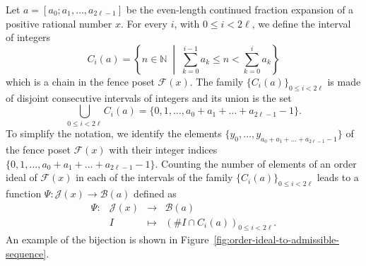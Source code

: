 \documentclass[a4paper,12pt]{amsart}
\newcommand{\N}{\mathbb{N}}
\newcommand{\xx}{{x}}
\newcommand{\Bcal}{{\mathcal{B}}}
\newcommand{\Fcal}{{\mathcal{F}}}
\newcommand{\Jcal}{{\mathcal{J}}}
\newcommand{\0}{\mathtt{0}}
\newcommand{\1}{\mathtt{1}}
\newcommand{\2}{\mathtt{2}}
\newcommand{\3}{\mathtt{3}}
\begin{document}
Let $a=[a_0;a_1,\dots,a_{2\ell-1}]$
be the even-length continued fraction expansion of a positive
rational number $x$.
For every $i$, with $0\leq i< 2\ell$,
we define the interval of integers
\[
    C_i(a) = \left\{n\in\N
        \;\middle\vert\;
        \sum_{k=0}^{i-1}a_k
        \leq n <
        \sum_{k=0}^{i}a_k\right\}
\]
which is a chain in the fence poset $\Fcal(\xx)$.
The family $\{C_i(a)\}_{0\leq i< 2\ell}$ is made of disjoint consecutive
intervals of integers and its union is the set
\[
    \bigcup_{0\leq i< 2\ell} C_i(a)
    = \{0,1,\dots,a_0+a_1+\dots+a_{2\ell-1}-1\}.
\]
To simplify the notation,
we identify the elements $\{y_0,\dots,y_{a_0+a_1+\dots+a_{2\ell-1}-1}\}$ 
of the fence poset $\Fcal(\xx)$ with their integer indices
$\{0,1,\dots,a_0+a_1+\dots+a_{2\ell-1}-1\}$.
Counting the number of elements of an order ideal of $\Fcal(\xx)$
in each of the intervals of the family
$\{C_i(a)\}_{0\leq i< 2\ell}$
leads to a function $\Psi:\Jcal(\xx)\to\Bcal(a)$ defined as
\[
\begin{array}{rccl}
    \Psi:&\Jcal(\xx) & \to & \Bcal(a)\\
    &I & \mapsto &
    \left(\# I\cap C_i(a)\right)_{0\leq i< 2\ell}.
\end{array}
\]
An example of the bijection is shown in Figure~\ref{fig:order-ideal-to-admissible-sequence}.
\end{document}
